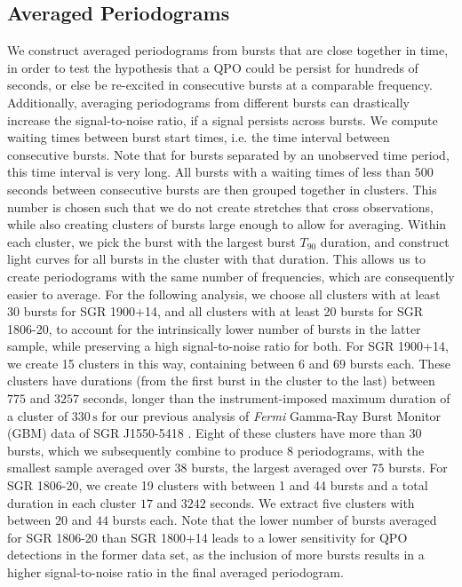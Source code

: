 \documentclass[numberedappendix]{emulateapj}
\begin{document}
\subsection{Averaged Periodograms}
\label{sec:psd_average}
We construct averaged periodograms from bursts that are close together in time, in order to test the hypothesis that a QPO could be persist for hundreds of seconds, or else be re-excited in consecutive bursts at a comparable frequency. Additionally, averaging periodograms from different bursts can drastically increase the signal-to-noise ratio, if a signal persists across bursts. We compute waiting times between burst start times, i.e. the time interval between consecutive bursts. Note that for bursts separated by an unobserved time period, this time interval is very long. All bursts with a waiting times of less than $500$ seconds between consecutive bursts are then grouped together in clusters. This number is chosen such that we do not create stretches that cross observations, while also creating clusters of bursts large enough to allow for averaging. Within each cluster, we pick the burst with the largest burst $T_{90}$ duration, and construct light curves for all bursts in the cluster with that duration. This allows us to create periodograms with the same number of frequencies, which are consequently easier to average. For the following analysis, we choose all clusters with at least 30 bursts for SGR 1900+14, and all clusters with at least 20 bursts for SGR 1806-20, to account for the intrinsically lower number of bursts in the latter sample, while preserving a high signal-to-noise ratio for both.
For SGR 1900+14, we create 15 clusters in this way, containing between $6$ and $69$ bursts each. These clusters have durations (from the first burst in the cluster to the last) between $775$ and $3257$ seconds, longer than the instrument-imposed maximum duration of a cluster of $330 \, \mathrm{s}$ for our previous analysis of {\it Fermi} Gamma-Ray Burst Monitor (GBM) data of SGR J1550-5418 \citep{huppenkothen14}. Eight of these clusters have more than $30$ bursts, which we subsequently combine to produce 8 periodograms, with the smallest sample averaged over $38$ bursts, the largest averaged over $75$ bursts.
For SGR 1806-20, we create 19 clusters with between 1 and 44 bursts and a total duration in each cluster $17$ and $3242$ seconds. We extract five clusters with between $20$ and $44$ bursts each. Note that the lower number of bursts averaged for SGR 1806-20 than SGR 1800+14 leads to a lower sensitivity for QPO detections in the former data set, as the inclusion of more bursts results in a higher signal-to-noise ratio in the final averaged periodogram.
\end{document}

